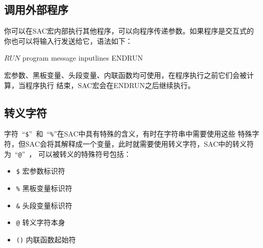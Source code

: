 \subsection{调用外部程序}
你可以在SAC宏内部执行其他程序，可以向程序传递参数。如果程序是交互式的
你也可以将输入行发送给它，语法如下：
\begin{SACCode}
$RUN$ program message
inputlines
ENDRUN
\end{SACCode}
宏参数、黑板变量、头段变量、内联函数均可使用，在程序执行之前它们会被计算，当程序执行
结束，SAC宏会在ENDRUN之后继续执行。

\subsection{转义字符}
字符~``\verb+$+''~和~``\verb+%+''在SAC中具有特殊的含义，有时在字符串中需要使用这些
特殊字符，但SAC会将其解释成一个变量，此时就需要使用转义字符，SAC中的转义符为~``\verb+@+''~，
可以被转义的特殊符号包括：
\begin{itemize}
    \item \verb+$+  宏参数标识符
    \item \verb+%+  黑板变量标识符
    \item \verb+&+  头段变量标识符
    \item \verb+@+  转义字符本身
    \item \verb+()+  内联函数起始符
\end{itemize}
